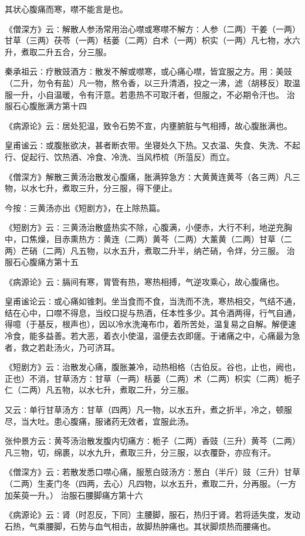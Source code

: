 \documentclass[a4paper,12pt,UTF8,twoside]{ctexbook}
\begin{document}
其状心腹痛而寒，噤不能言是也。

《僧深方》云∶解散人参汤常用治心噤或寒噤不解方∶人参（二两）干姜（一两）甘草（三两）茯苓（一两）栝蒌（二两）白术（一两）枳实（一两）凡七物，水六升，煮取二升五合，分三服。

秦承祖云∶疗散豉酒方∶散发不解或噤寒，或心痛心噤，皆宜服之方。用∶美豉（二升，勿令有盐）凡一物，熬令香，以三升清酒，投之一沸，滤（胡移反）取温服一升，小自温暖，令有汗意。若患热不可取汗者，但服之，不必期令汗也。
治服石心腹胀满方第十四

《病源论》云∶居处犯温，致令石势不宣，内壅腑脏与气相搏，故心腹胀满也。

皇甫谧云∶或腹胀欲决，甚者断衣带。坐寝处久下热。又衣温、失食、失洗、不起行、促起行、饮热酒、冷食、冷洗、当风栉梳（所菹反）而立。

《僧深方》解散三黄汤治散发心腹痛，胀满猝急方∶大黄黄连黄芩（各三两）凡三物，以水七升，煮取三升，分三服，得下便止。

今按∶三黄汤亦出《短剧方》，在上除热篇。

《短剧方》云∶三黄汤治散盛热实不除，心腹满，小便赤，大行不利，地逆充胸中，口焦燥，目赤熏热方∶黄连（二两）黄芩（二两）大薰黄（二两）甘草（二两）芒硝（二两）凡五物，以水五升，煮取二升半，纳芒硝，令烊，分三服。
治服石心腹痛方第十五

《病源论》云∶膈间有寒，胃管有热，寒热相搏，气逆攻乘心，故心腹痛也。

皇甫谧论云∶或心痛如锥刺。坐当食而不食，当洗而不洗，寒热相交，气结不通，结在心中，口噤不得息，当绞口捉与热酒，任本性多少。其令酒两得，行气自通，得噫（于基反，根声也），因以冷水洗淹布巾，着所苦处，温复易之自解。解便速冷食，能多益善。若大恶，着衣小使温，温便去衣即瘥。于诸痛之中，心痛最为急者，救之若赴汤火，乃可济耳。

《短剧方》云∶治散发心痛，腹胀兼冷，动热相格（古伯反。谷也，止也，阙也，正也）不消，甘草汤方∶甘草（一两）栝蒌（二两）术（二两）枳实（二两）栀子仁（二两）凡五物，以水七升，煮取二升，分三服。

又云∶单行甘草汤方∶甘草（四两）凡一物，以水五升，煮之折半，冷之，顿服尽，当大吐。患心腹痛，服诸药无效者，宜服此汤。

张仲景方云∶黄芩汤治散发腹内切痛方∶栀子（二两）香豉（三升）黄芩（二两）凡三物，切，绵裹，以水九升，煮取三升，分三服，以衣覆卧，亦应有汗。

《僧深方》云∶若散发悉口噤心痛，服葱白豉汤方∶葱白（半斤）豉（三升）甘草（二两）生麦门冬（四两，去心）凡四物，以水五升，煮取二升，分再服。（一方加茱萸一升。）
治服石腰脚痛方第十六

《病源论》云∶肾（时忍反，下同）主腰脚，服石，热归于肾。若将适失度，发动石热，气乘腰脚，石势与血气相击，故脚热肿痛也。其状脚烦热而腰痛也。
\end{document}
